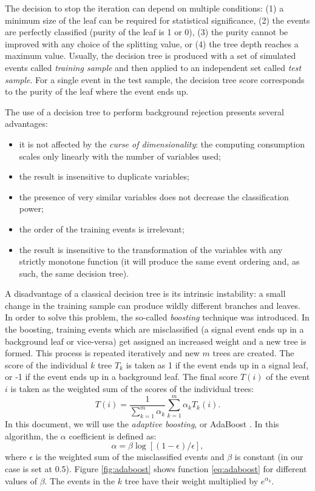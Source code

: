 The decision to stop the iteration can depend on multiple conditions: (1) a minimum size of the leaf can be required for statistical significance, (2) the events are perfectly classified (purity of the leaf is 1 or 0), (3) the purity cannot be improved with any choice of the splitting value, or (4) the tree depth reaches a maximum value. 
Usually, the decision tree is produced with a set of simulated events called \emph{training sample} and then applied to an independent set called \emph{test sample}.
For a single event in the test sample, the decision tree score corresponds to the purity of the leaf where the event ends up. 

The use of a decision tree to perform background rejection presents several advantages: 
\begin{itemize}
    \item it is not affected by the \emph{curse of dimensionality}: the computing consumption scales only linearly with the number of variables used;
    \item the result is insensitive to duplicate variables;
    \item the presence of very similar variables does not decrease the classification power;
    \item the order of the training events is irrelevant;
    \item the result is insensitive to the transformation of the variables with any strictly monotone function (it will produce the same event ordering and, as such, the same decision tree).
\end{itemize}

A disadvantage of a classical decision tree is its intrinsic instability: a small change in the training sample can produce wildly different branches and leaves. In order to solve this problem, the so-called \emph{boosting} technique was introduced. In the boosting, training events which are misclassified (a signal event ends up in a background leaf or vice-versa) get assigned an increased weight and a new tree is formed. This process is repeated iteratively and new $m$ trees are created. The score of the individual $k$ tree $T_k$ is taken as 1 if the event ends up in a signal leaf, or -1 if the event ends up in a background leaf.  The final score $T(i)$ of the event $i$ is taken as the weighted sum of the scores of the individual trees:
\begin{equation}
    T(i) = \frac{1}{\sum^m_{k=1} \alpha_k} \sum^m_{k=1}\alpha_k T_k(i).
\end{equation}
In this document, we will use the \emph{adaptive boosting}, or AdaBoost \cite{freund1999short}. In this algorithm, the $\alpha$ coefficient is defined as:
\begin{equation}
    \alpha = \beta \log[(1-\epsilon)/\epsilon],\label{eq:adaboost}
\end{equation}
where $\epsilon$ is the weighted sum of the misclassified events and $\beta$ is constant (in our case is set at 0.5). Figure \ref{fig:adaboost} shows function \eqref{eq:adaboost} for different values of $\beta$. The events in the $k$ tree have their weight multiplied by $e^{\alpha_k}$.


